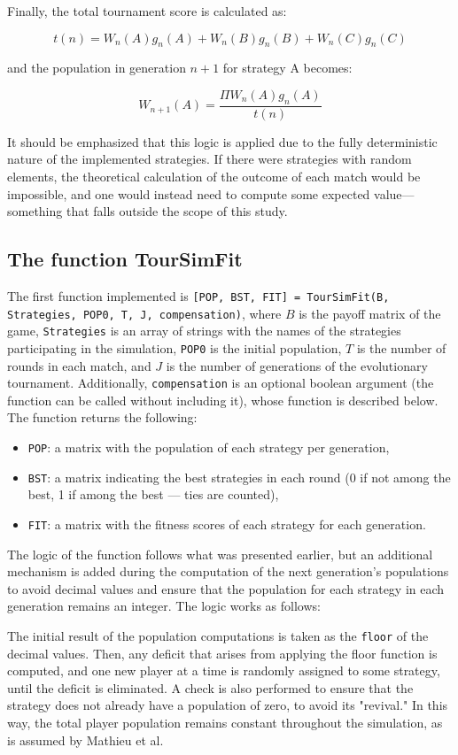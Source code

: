 \documentclass[12pt]{article}
\begin{document}
Finally, the total tournament score is calculated as:

\[
t(n) = W_n(A)g_n(A) + W_n(B)g_n(B) + W_n(C)g_n(C)
\]

and the population in generation $n+1$ for strategy A becomes:

\[
W_{n+1}(A) = \frac{\Pi W_n(A)g_n(A)}{t(n)}
\]

It should be emphasized that this logic is applied due to the fully deterministic nature of the implemented strategies. If there were strategies with random elements, the theoretical calculation of the outcome of each match would be impossible, and one would instead need to compute some expected value---something that falls outside the scope of this study.
\subsection{The function TourSimFit}
The first function implemented is \texttt{[POP, BST, FIT] = TourSimFit(B, Strategies, POP0, T, J, compensation)}, where $B$ is the payoff matrix of the game, \texttt{Strategies} is an array of strings with the names of the strategies participating in the simulation, \texttt{POP0} is the initial population, $T$ is the number of rounds in each match, and $J$ is the number of generations of the evolutionary tournament. Additionally, \texttt{compensation} is an optional boolean argument (the function can be called without including it), whose function is described below. The function returns the following:

\begin{itemize}
    \item \texttt{POP}: a matrix with the population of each strategy per generation,
    \item \texttt{BST}: a matrix indicating the best strategies in each round (0 if not among the best, 1 if among the best — ties are counted),
    \item \texttt{FIT}: a matrix with the fitness scores of each strategy for each generation.
\end{itemize}

The logic of the function follows what was presented earlier, but an additional mechanism is added during the computation of the next generation’s populations to avoid decimal values and ensure that the population for each strategy in each generation remains an integer. The logic works as follows:

The initial result of the population computations is taken as the \texttt{floor} of the decimal values. Then, any deficit that arises from applying the floor function is computed, and one new player at a time is randomly assigned to some strategy, until the deficit is eliminated. A check is also performed to ensure that the strategy does not already have a population of zero, to avoid its "revival." In this way, the total player population remains constant throughout the simulation, as is assumed by Mathieu et al.
\end{document}
